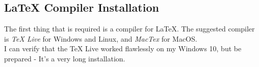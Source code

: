\documentclass{article}
\newcommand{\latex}{\LaTeX\xspace}
\begin{document}
\subsection{\latex Compiler Installation}
The first thing that is required is a compiler for \latex. The suggested compiler is \emph{TeX Live} for Windows and Linux, and \emph{MacTex} for MacOS.\\
I can verify that the TeX Live worked flawlessly on my Windows 10, but be prepared - It's a very long installation.

\subsection{}

\end{document}
